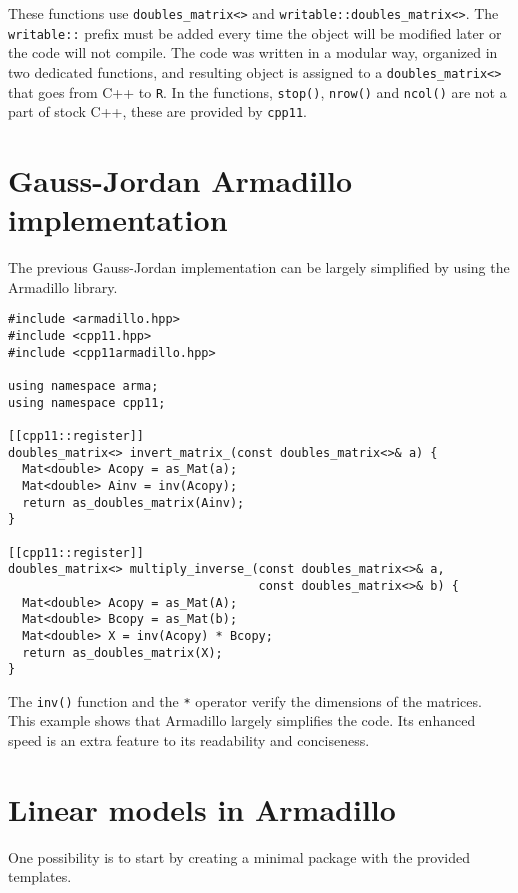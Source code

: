 These functions use \texttt{doubles\_matrix\textless{}\textgreater{}} and \texttt{writable::doubles\_matrix\textless{}\textgreater{}}. The
\texttt{writable::} prefix must be added every time the object will be modified later
or the code will not compile. The code was written in a modular way, organized
in two dedicated functions, and resulting object is assigned to a
\texttt{doubles\_matrix\textless{}\textgreater{}} that goes from C++ to \texttt{R}. In the functions, \texttt{stop()},
\texttt{nrow()} and \texttt{ncol()} are not a part of stock C++, these are provided by
\texttt{cpp11}.

\hypertarget{gauss-jordan-armadillo-implementation}{%
\section{Gauss-Jordan Armadillo implementation}\label{gauss-jordan-armadillo-implementation}}

The previous Gauss-Jordan implementation can be largely simplified by using the
Armadillo library.

\begin{verbatim}
#include <armadillo.hpp>
#include <cpp11.hpp>
#include <cpp11armadillo.hpp>

using namespace arma;
using namespace cpp11;

[[cpp11::register]]
doubles_matrix<> invert_matrix_(const doubles_matrix<>& a) {
  Mat<double> Acopy = as_Mat(a);
  Mat<double> Ainv = inv(Acopy);
  return as_doubles_matrix(Ainv);
}

[[cpp11::register]]
doubles_matrix<> multiply_inverse_(const doubles_matrix<>& a,
                                   const doubles_matrix<>& b) {
  Mat<double> Acopy = as_Mat(A);
  Mat<double> Bcopy = as_Mat(b);
  Mat<double> X = inv(Acopy) * Bcopy;
  return as_doubles_matrix(X);
}
\end{verbatim}

The \texttt{inv()} function and the \texttt{*} operator verify the dimensions of the matrices.
This example shows that Armadillo largely simplifies the code. Its enhanced
speed is an extra feature to its readability and conciseness.

\hypertarget{linear-models-in-armadillo}{%
\section{Linear models in Armadillo}\label{linear-models-in-armadillo}}

One possibility is to start by creating a minimal package with the provided
templates.


